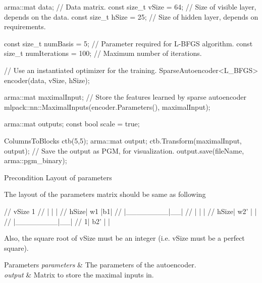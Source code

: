 \begin{DoxyCode}
arma::mat data; \textcolor{comment}{// Data matrix.}
\textcolor{keyword}{const} \textcolor{keywordtype}{size\_t} vSize = 64; \textcolor{comment}{// Size of visible layer, depends on the data.}
\textcolor{keyword}{const} \textcolor{keywordtype}{size\_t} hSize = 25; \textcolor{comment}{// Size of hidden layer, depends on requirements.}

\textcolor{keyword}{const} \textcolor{keywordtype}{size\_t} numBasis = 5; \textcolor{comment}{// Parameter required for L-BFGS algorithm.}
\textcolor{keyword}{const} \textcolor{keywordtype}{size\_t} numIterations = 100; \textcolor{comment}{// Maximum number of iterations.}

\textcolor{comment}{// Use an instantiated optimizer for the training.}
SparseAutoencoder<L\_BFGS> encoder(data, vSize, hSize);

arma::mat maximalInput; \textcolor{comment}{// Store the features learned by sparse autoencoder}
mlpack::nn::MaximalInputs(encoder.Parameters(), maximalInput);

arma::mat outputs;
\textcolor{keyword}{const} \textcolor{keywordtype}{bool} scale = \textcolor{keyword}{true};

ColumnsToBlocks ctb(5,5);
arma::mat output;
ctb.Transform(maximalInput, output);
\textcolor{comment}{// Save the output as PGM, for visualization.}
output.save(fileName, arma::pgm\_binary);
\end{DoxyCode}


\begin{DoxyPrecond}{Precondition}
Layout of parameters
\end{DoxyPrecond}
The layout of the parameters matrix should be same as following 
\begin{DoxyCode}
\textcolor{comment}{//          vSize   1}
\textcolor{comment}{//       |        |  |}
\textcolor{comment}{//  hSize|   w1   |b1|}
\textcolor{comment}{//       |\_\_\_\_\_\_\_\_|\_\_|}
\textcolor{comment}{//       |        |  |}
\textcolor{comment}{//  hSize|   w2'  |  |}
\textcolor{comment}{//       |\_\_\_\_\_\_\_\_|\_\_|}
\textcolor{comment}{//      1|   b2'  |  |}
\end{DoxyCode}


Also, the square root of v\+Size must be an integer (i.\+e. v\+Size must be a perfect square).


\begin{DoxyParams}{Parameters}
{\em parameters} & The parameters of the autoencoder. \\
\hline
{\em output} & Matrix to store the maximal inputs in. \\
\hline
\end{DoxyParams}
